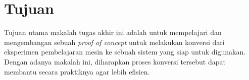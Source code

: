 \section{Tujuan}

Tujuan utama makalah tugas akhir ini adalah untuk mempelajari dan mengembangan sebuah \textit{proof of concept} untuk melakukan konversi dari eksperimen pembelajaran mesin ke sebuah sistem yang siap untuk digunakan.
Dengan adanya makalah ini, diharapkan proses konversi tersebut dapat membantu secara praktiknya agar lebih efisien.
